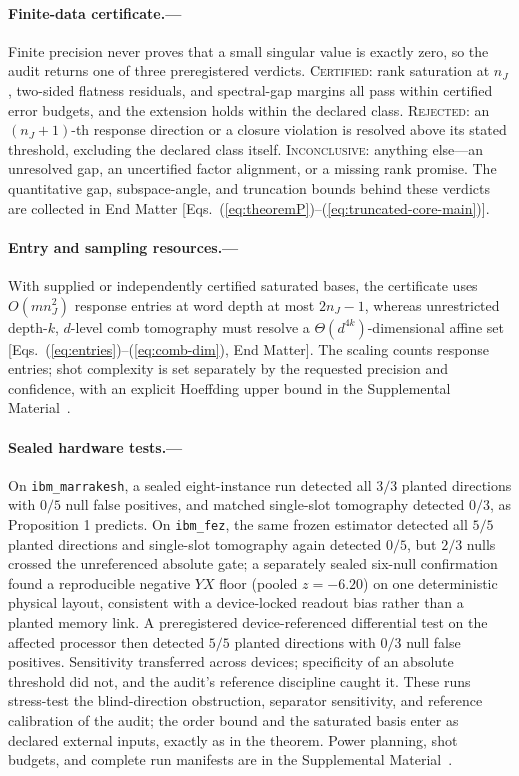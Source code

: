 \documentclass[aps,prl,reprint,superscriptaddress,nofootinbib]{revtex4-2}
\begin{document}
\paragraph{Finite-data certificate.---}
Finite precision never proves that a small singular value is exactly zero, so the audit returns one of three preregistered verdicts.  \textsc{Certified}: rank saturation at $n_J$, two-sided flatness residuals, and spectral-gap margins all pass within certified error budgets, and the extension holds within the declared class.  \textsc{Rejected}: an $(n_J{+}1)$-th response direction or a closure violation is resolved above its stated threshold, excluding the declared class itself.  \textsc{Inconclusive}: anything else---an unresolved gap, an uncertified factor alignment, or a missing rank promise.  The quantitative gap, subspace-angle, and truncation bounds behind these verdicts are collected in End Matter [Eqs.~(\ref{eq:theoremP})--(\ref{eq:truncated-core-main})].

\paragraph{Entry and sampling resources.---}
With supplied or independently certified saturated bases, the certificate uses $O(mn_J^2)$ response entries at word depth at most $2n_J-1$, whereas unrestricted depth-$k$, $d$-level comb tomography must resolve a $\Theta(d^{4k})$-dimensional affine set [Eqs.~(\ref{eq:entries})--(\ref{eq:comb-dim}), End Matter].  The scaling counts response entries; shot complexity is set separately by the requested precision and confidence, with an explicit Hoeffding upper bound in the Supplemental Material~\cite{SupplementalMaterial}.

\paragraph{Sealed hardware tests.---}
On \texttt{ibm\_marrakesh}, a sealed eight-instance run detected all $3/3$ planted directions with $0/5$ null false positives, and matched single-slot tomography detected $0/3$, as Proposition 1 predicts.  On \texttt{ibm\_fez}, the same frozen estimator detected all $5/5$ planted directions and single-slot tomography again detected $0/5$, but $2/3$ nulls crossed the unreferenced absolute gate; a separately sealed six-null confirmation found a reproducible negative $YX$ floor (pooled $z=-6.20$) on one deterministic physical layout, consistent with a device-locked readout bias rather than a planted memory link.  A preregistered device-referenced differential test on the affected processor then detected $5/5$ planted directions with $0/3$ null false positives.  Sensitivity transferred across devices; specificity of an absolute threshold did not, and the audit's reference discipline caught it.  These runs stress-test the blind-direction obstruction, separator sensitivity, and reference calibration of the audit; the order bound and the saturated basis enter as declared external inputs, exactly as in the theorem.  Power planning, shot budgets, and complete run manifests are in the Supplemental Material~\cite{SupplementalMaterial}.
\end{document}
